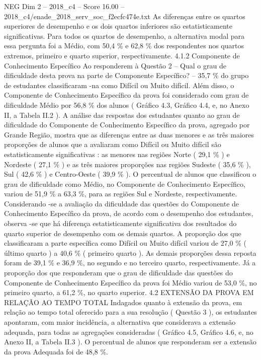 \begin{textsample}{NEG Dim 2 – 2018\_c4 – Score 16.00 – 2018\_c4/enade\_2018\_serv\_soc\_f2ecfc474e.txt}
As diferenças entre os quartos superiores de desempenho e os dois quartos inferiores são estatisticamente significativas.
Para todos os quartos de desempenho, a alternativa modal para essa pergunta foi a Médio, com 50,4 \% e 62,8 \% dos respondentes nos quartos extremos, primeiro e quarto superior, respectivamente. 4.1.2 Componente de Conhecimento Específico Ao responderem à Questão 2 – Qual o grau de dificuldade desta prova na parte de Componente Específico? – 35,7 \% do grupo de estudantes classificaram -na como Difícil ou Muito difícil.
Além disso, o Componente de Conhecimento Específico da prova foi considerado com grau de dificuldade Médio por 56,8 \% dos alunos ( Gráfico 4.3, Gráfico 4.4, e, no Anexo II, a Tabela II.2 ).
A análise das respostas dos estudantes quanto ao grau de dificuldade do Componente de Conhecimento Específico da prova, agregado por Grande Região, mostra que as diferenças entre as duas menores e as três maiores proporções de alunos que a avaliaram como Difícil ou Muito difícil são estatisticamente significativas : as menores nas regiões Norte ( 29,1 \% ) e Nordeste ( 27,1 \% ) e as três maiores proporções nas regiões Sudeste ( 35,6 \% ), Sul ( 42,6 \% ) e Centro-Oeste ( 39,9 \% ).
O percentual de alunos que classificou o grau de dificuldade como Médio, no Componente de Conhecimento Específico, variou de 51,9 \% a 63,3 \%, para as regiões Sul e Nordeste, respectivamente.
Considerando -se a avaliação da dificuldade das questões do Componente de Conhecimento Específico da prova, de acordo com o desempenho dos estudantes, observa -se que há diferença estatisticamente significativa dos resultados do quarto superior de desempenho com os demais quartos.
A proporção dos que classificaram a parte específica como Difícil ou Muito difícil variou de 27,0 \% ( último quarto ) a 40,6 \% ( primeiro quarto ).
As demais proporções dessa reposta foram de 39,1 \% e 36,9 \%, no segundo e no terceiro quarto, respectivamente.
Já a proporção dos que responderam que o grau de dificuldade das questões do Componente de Conhecimento Específico da prova foi Médio variou de 53,0 \%, no primeiro quarto, a 61,2 \%, no quarto superior. 4.2 EXTENSÃO DA PROVA EM RELAÇÃO AO TEMPO TOTAL Indagados quanto à extensão da prova, em relação ao tempo total oferecido para a sua resolução ( Questão 3 ), os estudantes apontaram, com maior incidência, a alternativa que considerava a extensão adequada, para todas as agregações consideradas ( Gráfico 4.5, Gráfico 4.6, e, no Anexo II, a Tabela II.3 ).
O percentual de alunos que responderam ser a extensão da prova Adequada foi de 48,8 \%.

\end{textsample}
